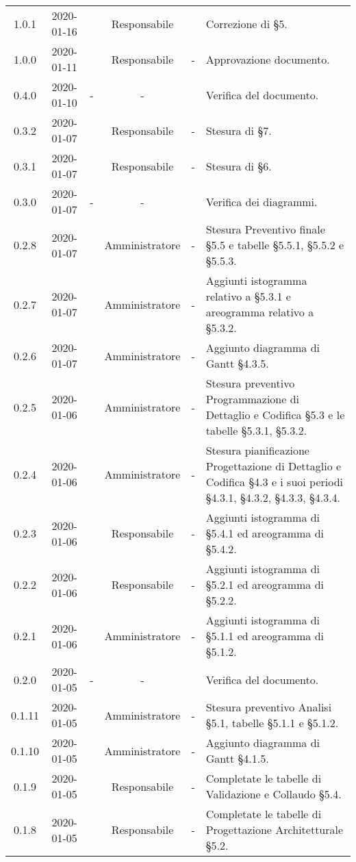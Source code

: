 {\begin{longtable}{ c c  C{2.3cm} c C{3cm} C{3.2cm}}
1.0.1 & 2020-01-16 & \SE{} & Responsabile & \PF{} & Correzione di §5. \\
1.0.0 & 2020-01-11 & \SE{} & Responsabile & - & Approvazione documento. \\
0.4.0 & 2020-01-10 & - & - & \AT{} & Verifica del documento. \\
0.3.2 & 2020-01-07 & \SE{} & Responsabile & - & Stesura di §7. \\
0.3.1 & 2020-01-07 & \SE{} & Responsabile & - & Stesura di §6. \\
0.3.0 & 2020-01-07 & - & - & \MC{} & Verifica dei diagrammi. \\
0.2.8 & 2020-01-07 & \LD{} & Amministratore & - & Stesura Preventivo finale §5.5 e tabelle §5.5.1, §5.5.2 e §5.5.3. \\
0.2.7 & 2020-01-07 & \LD{} & Amministratore & - & Aggiunti istogramma relativo a §5.3.1 e areogramma relativo a §5.3.2. \\
0.2.6 & 2020-01-07 & \LD{} & Amministratore & - & Aggiunto diagramma di Gantt §4.3.5. \\
0.2.5 & 2020-01-06 & \LD{} & Amministratore & - & Stesura preventivo Programmazione di Dettaglio e Codifica §5.3 e le tabelle §5.3.1, §5.3.2. \\
0.2.4 & 2020-01-06 & \LD{} & Amministratore & - & Stesura pianificazione Progettazione di Dettaglio e Codifica §4.3 e i suoi periodi §4.3.1, §4.3.2, §4.3.3, §4.3.4. \\
0.2.3 & 2020-01-06 & \SE{} & Responsabile & - & Aggiunti istogramma di §5.4.1 ed areogramma di §5.4.2. \\
0.2.2 & 2020-01-06 & \SE{} & Responsabile & - & Aggiunti istogramma di §5.2.1 ed areogramma di §5.2.2. \\
0.2.1 & 2020-01-06 & \LD{} & Amministratore & - & Aggiunti istogramma di §5.1.1 ed areogramma di §5.1.2. \\
0.2.0 & 2020-01-05 & - & - & \MC{} & Verifica del documento. \\
0.1.11 & 2020-01-05 & \LD{} & Amministratore & - & Stesura preventivo Analisi §5.1, tabelle §5.1.1 e §5.1.2. \\
0.1.10 & 2020-01-05 & \LD{} & Amministratore & - & Aggiunto diagramma di Gantt §4.1.5. \\
0.1.9 & 2020-01-05 & \SE{} & Responsabile & - & Completate le tabelle di Validazione e Collaudo §5.4.\\
0.1.8 & 2020-01-05 & \SE{} & Responsabile & - & Completate le tabelle di Progettazione Architetturale §5.2. \\

\end{longtable}}

